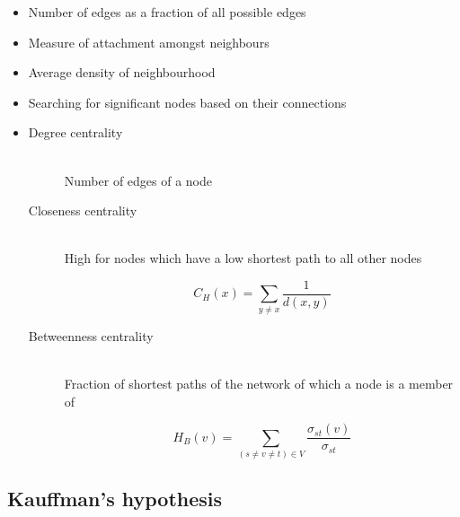 \documentclass[a4paper]{article}
\begin{document}

\begin{itemize}
  \item
    Number of edges as a fraction of all possible edges
\end{itemize}


\begin{itemize}
  \item
    Measure of attachment amongst neighbours

  \item
    Average density of neighbourhood
\end{itemize}


\begin{itemize}
  \item
    Searching for significant nodes based on their connections

  \item
    \begin{description}
      \item[Degree centrality] \hfill \\
        Number of edges of a node

      \item[Closeness centrality] \hfill \\
        High for nodes which have a low shortest path to all other nodes

        \[
          C_{H}(x) = \sum_{y \neq x} \frac{1}{d(x, y)}
        \]

      \item[Betweenness centrality] \hfill \\
        Fraction of shortest paths of the network of which a node is a member of

        \[
          H_{B}(v) = \sum_{(s \neq v \neq t) \in V} \frac{\sigma_{st}(v)}{\sigma_{st}}
        \]

    \end{description}
\end{itemize}

\subsection{Kauffman's hypothesis}
\end{document}
